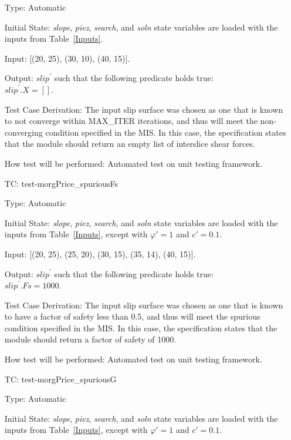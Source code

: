 \documentclass[12pt, titlepage]{article}
\newcounter{utestnum} %
\begin{document}
\begin{enumerate}[label=TC\arabic*:,ref={\arabic*}]
	Type: Automatic
	
	Initial State: \textit{slope}, \textit{piez}, \textit{search}, and 
	\textit{soln} state variables are loaded with the inputs from 
	Table~\ref{Inputs}.
	
	Input: [(20, 25), (30, 10), (40, 15)].
	
	Output: $\textit{slip}^\prime$ such that the following predicate holds 
	true:\\ 
	$\textit{slip}^\prime.\textit{X} = []$.
	
	Test Case Derivation: The input slip surface was chosen as one that is 
	known to not converge within MAX\_ITER iterations, and thus will meet the 
	non-converging condition specified in the MIS. In this case, the 
	specification states that the module should return an empty list of 
	interslice shear forces.
	
	How test will be performed: Automated test on unit testing framework.
	
	\item [TC\refstepcounter{utestnum}\theutestnum: 
	\label{TC_MorgPriceSpuriousFs}] 
	test-morgPrice\_spuriousFs
	
	Type: Automatic
	
	Initial State: \textit{slope}, \textit{piez}, \textit{search}, and 
	\textit{soln} state variables are loaded with the inputs from 
	Table~\ref{Inputs}, except with $\varphi' = 1$ and $c' = 0.1$.
	
	Input: [(20, 25), (25, 20), (30, 15), (35, 14), (40, 15)].
	
	Output: $\textit{slip}^\prime$ such that the following predicate holds 
	true:\\ 
	$\textit{slip}^\prime.\textit{Fs} = 1000$.
	
	Test Case Derivation: The input slip surface was chosen as one that is 
	known to have a factor of safety less than 0.5, and thus will meet the 
	spurious condition specified in the MIS. In this case, the specification 
	states that the module should return a factor of safety of 1000.
	
	How test will be performed: Automated test on unit testing framework.
	
	\item [TC\refstepcounter{utestnum}\theutestnum: 
	\label{TC_MorgPriceSpuriousG}] 
	test-morgPrice\_spuriousG
	
	Type: Automatic
	
	Initial State: \textit{slope}, \textit{piez}, \textit{search}, and 
	\textit{soln} state variables are loaded with the inputs from 
	Table~\ref{Inputs}, except with $\varphi' = 1$ and $c' = 0.1$.
	

\end{enumerate}
\end{document}
